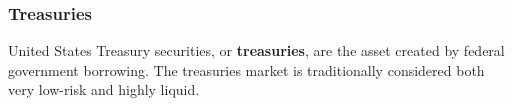 \subsubsection*{Treasuries}
\vspace{-1mm}

\begin{minipage}{0.76\textwidth}
\hypertarget{captreas}{\label{captreas}}
\small United States Treasury securities, or \textbf{treasuries}, are the asset created by federal government borrowing. The treasuries market is traditionally considered both very low-risk and highly liquid. 

 
\end{minipage}
\vspace{1mm}

